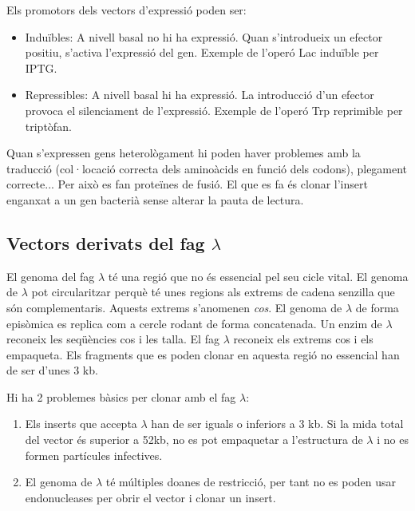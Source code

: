 Els promotors dels vectors d'expressió poden ser:
\begin{itemize}
\item Induïbles: A nivell basal no hi ha expressió. Quan s'introdueix
  un efector positiu, s'activa l'expressió del gen. Exemple de l'operó
  Lac induïble per IPTG.

\item Repressibles: A nivell basal hi ha expressió. La introducció
  d'un efector provoca el silenciament de l'expressió. Exemple de
  l'operó Trp reprimible per triptòfan.
\end{itemize}

Quan s'expressen gens heterològament hi poden haver problemes amb la
traducció (col·locació correcta dels aminoàcids en funció dels
codons), plegament correcte... Per això es fan proteïnes de fusió. El
que es fa és clonar l'insert enganxat a un gen bacterià sense alterar
la pauta de lectura.

\subsection{Vectors derivats del fag $\lambda$}
\label{sec:vectors-derivats-del}

El genoma del fag $\lambda$ té una regió que no és essencial pel seu
cicle vital. El genoma de $\lambda$ pot circularitzar perquè té unes
regions als extrems de cadena senzilla que són complementaris. Aquests
extrems s'anomenen \textit{cos}. El genoma de $\lambda$ de forma
episòmica es replica com a cercle rodant de forma concatenada. Un
enzim de $\lambda$ reconeix les seqüències cos i les talla. El fag $\lambda$
reconeix els extrems cos i els empaqueta. Els fragments que es poden
clonar en aquesta regió no essencial han de ser d'unes 3 kb.

Hi ha 2 problemes bàsics per clonar amb el fag $\lambda$:
\begin{enumerate}
\item Els inserts que accepta $\lambda$ han de ser iguals o inferiors
  a 3 kb. Si la mida total del vector és superior a 52kb, no es pot
  empaquetar a l'estructura de $\lambda$ i no es formen partícules
  infectives.

\item El genoma de $\lambda$ té múltiples doanes de restricció, per
  tant no es poden usar endonucleases per obrir el vector i clonar un insert.
\end{enumerate}

